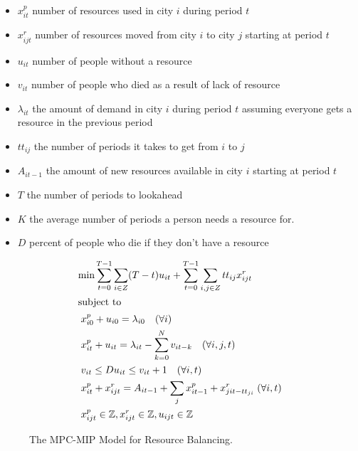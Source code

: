 \documentclass{article}
\begin{document}
\begin{itemize}
	\item $x^p_{it}$ number of resources used in city $i$ during period $t$
	\item $x^r_{ijt}$ number of resources moved from city $i$ to city $j$ starting at period $t$
	\item $u_{it}$ number of people without a resource
	\item $v_{it}$ number of people who died as a result of lack of resource
	\item $\lambda_{it}$ the amount of demand in city $i$ during period $t$ assuming everyone gets a resource in the previous period
	\item $tt_{ij}$ the number of periods it takes to get from $i$ to $j$
	\item $A_{it-1}$ the amount of new resources available in city $i$ starting at period $t$
	\item $T$ the number of periods to lookahead
	\item $K$ the average number of periods a person needs a resource for.
	\item $D$ percent of people who die if they don't have a resource
\end{itemize}

\begin{figure}[!t]
\begin{subequations} \label{mpc}
\begin{flalign}
& \text{min} \sum_{t=0}^{T-1}\sum_{i \in Z} (T - t)u_{it}  + \sum_{t=0}^{T-1} \sum_{i,j \in Z} tt_{ij} x^r_{ijt} \label{mpc:obj} \\
\intertext{subject to} 
& \; x^p_{i0}  + u_{i0} = \lambda_{i0} \quad (\forall i) \label{mpc:constr:demand_balance_0} \\
& \; x^p_{it}  + u_{it} = \lambda_{it} - \sum_{k=0}^N v_{it-k} \quad (\forall i,j,t) \label{mpc:constr:demand_balance} \\ 
& \; v_{it} \leq  D u_{it} \leq v_{it} + 1 \quad (\forall i,t) \\
& \; x^p_{it} + x^r_{ijt} = A_{it-1} + \sum_{j} x^p_{i t-1} + x^r_{jit - tt_{ji}} \; (\forall i,t)  \label{mpc:constr:balance} \\
& \; x^p_{ijt} \in \mathbb{Z}, x^r_{ijt} \in \mathbb{Z}, u_{ijt} \in \mathbb{Z}  \label{mpc:constr:domain}
\end{flalign}
\end{subequations}
\caption{The MPC-MIP Model for Resource Balancing.}
\label{fig:mpc}
\end{figure}
\end{document}
